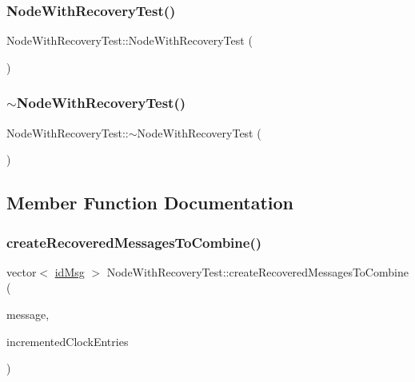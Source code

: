 \subsubsection{\texorpdfstring{Node\+With\+Recovery\+Test()}{NodeWithRecoveryTest()}}
{\footnotesize\ttfamily Node\+With\+Recovery\+Test\+::\+Node\+With\+Recovery\+Test (\begin{DoxyParamCaption}{ }\end{DoxyParamCaption})}

\mbox{\label{class_node_with_recovery_test_a91ac9cad83523696aee1a5c5718a62af}} 
\subsubsection{\texorpdfstring{$\sim$\+Node\+With\+Recovery\+Test()}{~NodeWithRecoveryTest()}}
{\footnotesize\ttfamily Node\+With\+Recovery\+Test\+::$\sim$\+Node\+With\+Recovery\+Test (\begin{DoxyParamCaption}{ }\end{DoxyParamCaption})\hspace{0.3cm}{\ttfamily [virtual]}}



\subsection{Member Function Documentation}
\mbox{\label{class_node_with_recovery_test_aa6b94e1bff36f3ec804d4ba136de96b8}} 
\subsubsection{\texorpdfstring{create\+Recovered\+Messages\+To\+Combine()}{createRecoveredMessagesToCombine()}}
{\footnotesize\ttfamily vector$<$ \hyperlink{structures_8h_a83a1d9a070efa5341da84cfd8e28d3e5}{id\+Msg} $>$ Node\+With\+Recovery\+Test\+::create\+Recovered\+Messages\+To\+Combine (\begin{DoxyParamCaption}\item[{const \hyperlink{structures_8h_a7e7bdc1d2fff8a9436f2f352b2711ed6}{message\+Info} \&}]{message,  }\item[{const vector$<$ unsigned int $>$ \&}]{incremented\+Clock\+Entries }\end{DoxyParamCaption})\hspace{0.3cm}{\ttfamily [protected]}}

